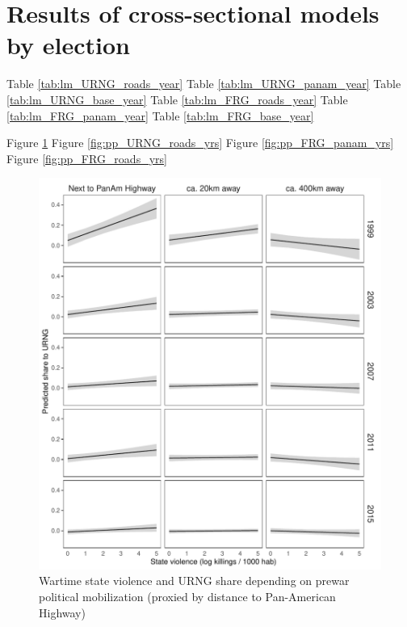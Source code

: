 \documentclass[a4paper, 12pt, notitlepage]{article}
\begin{document}
\clearpage
\section{Results of cross-sectional models by election}\label{app:results_year}

Table \ref{tab:lm_URNG_roads_year}
Table \ref{tab:lm_URNG_panam_year}
Table \ref{tab:lm_URNG_base_year}
Table \ref{tab:lm_FRG_roads_year}
Table \ref{tab:lm_FRG_panam_year}
Table \ref{tab:lm_FRG_base_year}

Figure \ref{fig:pp_URNG_panam_yrs}
Figure \ref{fig:pp_URNG_roads_yrs}
Figure \ref{fig:pp_FRG_panam_yrs}
Figure \ref{fig:pp_FRG_roads_yrs}









\begin{figure}[htb!]
  \centering
    \includegraphics[width = \textwidth]{img/pp_URNG_panam_year}

  \caption{Wartime state violence and URNG share depending on prewar political mobilization (proxied by distance to Pan-American Highway)} \label{fig:pp_URNG_panam_yrs}

\end{figure}
\end{document}
